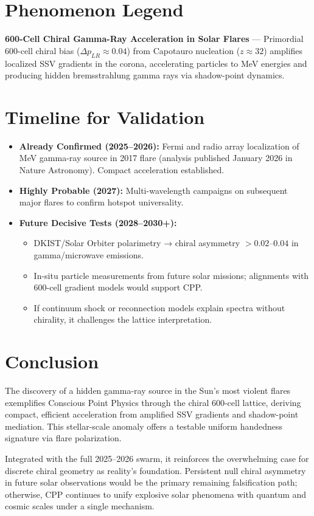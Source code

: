 \documentclass[11pt]{article}
\begin{document}
\section{Phenomenon Legend}
\textbf{600-Cell Chiral Gamma-Ray Acceleration in Solar Flares} — Primordial 600-cell chiral bias ($\Delta p_{LR} \approx 0.04$) from Capotauro nucleation ($z \approx 32$) amplifies localized SSV gradients in the corona, accelerating particles to MeV energies and producing hidden bremsstrahlung gamma rays via shadow-point dynamics.

\section{Timeline for Validation}
\begin{itemize}
    \item \textbf{Already Confirmed (2025--2026):} Fermi and radio array localization of MeV gamma-ray source in 2017 flare (analysis published January 2026 in Nature Astronomy). Compact acceleration established.
    \item \textbf{Highly Probable (2027):} Multi-wavelength campaigns on subsequent major flares to confirm hotspot universality.
    \item \textbf{Future Decisive Tests (2028--2030+):}
    \begin{itemize}
        \item DKIST/Solar Orbiter polarimetry → chiral asymmetry $>0.02$--$0.04$ in gamma/microwave emissions.
        \item In-situ particle measurements from future solar missions; alignments with 600-cell gradient models would support CPP.
        \item If continuum shock or reconnection models explain spectra without chirality, it challenges the lattice interpretation.
    \end{itemize}
\end{itemize}

\section{Conclusion}
The discovery of a hidden gamma-ray source in the Sun's most violent flares exemplifies Conscious Point Physics through the chiral 600-cell lattice, deriving compact, efficient acceleration from amplified SSV gradients and shadow-point mediation. This stellar-scale anomaly offers a testable uniform handedness signature via flare polarization.  

Integrated with the full 2025--2026 swarm, it reinforces the overwhelming case for discrete chiral geometry as reality's foundation. Persistent null chiral asymmetry in future solar observations would be the primary remaining falsification path; otherwise, CPP continues to unify explosive solar phenomena with quantum and cosmic scales under a single mechanism.
\end{document}
